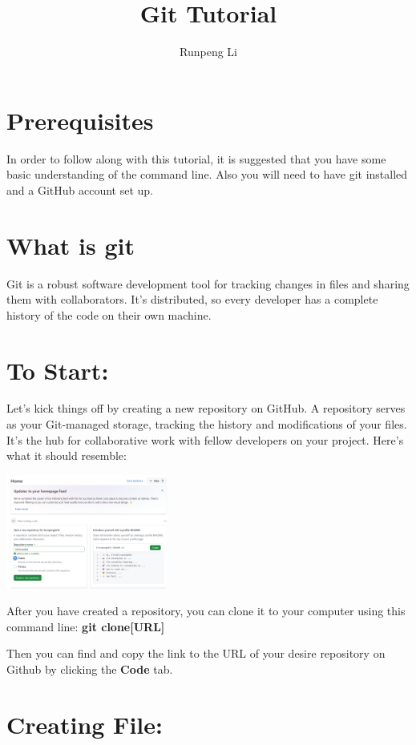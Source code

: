 \documentclass[10pt,twocolumn]{article}
\title{Git Tutorial}
\author{Runpeng Li}
\affiliation{Occidental College}
\begin{document}
\maketitle

\section{Prerequisites}

In order to follow along with this tutorial, it is suggested that you have some basic understanding of the command line. Also you will need to have git installed and a GitHub account set up.

\section{What is git}

Git is a robust software development tool for tracking changes in files and sharing them with collaborators. It's distributed, so every developer has a complete history of the code on their own machine.

\section{To Start:}

Let's kick things off by creating a new repository on GitHub. A repository serves as your Git-managed storage, tracking the history and modifications of your files. It's the hub for collaborative work with fellow developers on your project. Here's what it should resemble:

\includegraphics[width = 0.4\textwidth]{Start.png}

After you have created a repository, you can clone it to your computer using this command line: \textbf{git clone[URL]} 

Then you can find and copy the link to the URL of your desire repository on Github by clicking the \textbf{Code} tab. 

\section{Creating File: }
\end{document}
